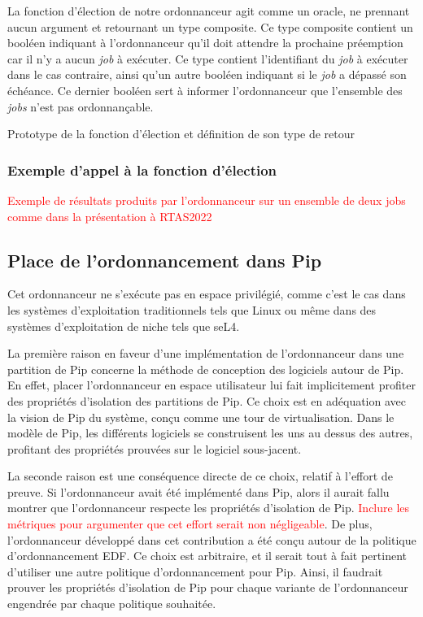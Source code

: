 		La fonction d'élection de notre ordonnanceur agit comme un oracle, ne prennant aucun argument et retournant un type composite. Ce type composite contient un booléen indiquant à l'ordonnanceur qu'il doit attendre la prochaine préemption car il n'y a aucun \emph{job} à exécuter. Ce type contient l'identifiant du \emph{job} à exécuter dans le cas contraire, ainsi qu'un autre booléen indiquant si le \emph{job} a dépassé son échéance. Ce dernier booléen sert à informer l'ordonnanceur que l'ensemble des \emph{jobs} n'est pas ordonnançable. 

		\begin{listing}[!ht]
			\caption{Prototype de la fonction d'élection et définition de son type de retour }
		\end{listing}

			\subsubsection{Exemple d'appel à la fonction d'élection}

			\textcolor{red}{Exemple de résultats produits par l'ordonnanceur sur un ensemble de deux jobs comme dans la présentation à RTAS2022}

		\subsection{Place de l'ordonnancement dans Pip}

		Cet ordonnanceur ne s'exécute pas en espace privilégié, comme c'est le cas dans les systèmes d'exploitation traditionnels tels que Linux ou même dans des systèmes d'exploitation de niche tels que seL4. 

		La première raison en faveur d'une implémentation de l'ordonnanceur dans une partition de Pip concerne la méthode de conception des logiciels autour de Pip. En effet, placer l'ordonnanceur en espace utilisateur lui fait implicitement profiter des propriétés d'isolation des partitions de Pip. Ce choix est en adéquation avec la vision de Pip du système, conçu comme une tour de virtualisation. Dans le modèle de Pip, les différents logiciels se construisent les uns au dessus des autres, profitant des propriétés prouvées sur le logiciel sous-jacent.

		La seconde raison est une conséquence directe de ce choix, relatif à l'effort de preuve. Si l'ordonnanceur avait été implémenté dans Pip, alors il aurait fallu montrer que l'ordonnanceur respecte les propriétés d'isolation de Pip. \textcolor{red}{Inclure les métriques pour argumenter que cet effort serait non négligeable}. De plus, l'ordonnanceur développé dans cet contribution a été conçu autour de la politique d'ordonnancement EDF. Ce choix est arbitraire, et il serait tout à fait pertinent d'utiliser une autre politique d'ordonnancement pour Pip. Ainsi, il faudrait prouver les propriétés d'isolation de Pip pour chaque variante de l'ordonnanceur engendrée par chaque politique souhaitée.

